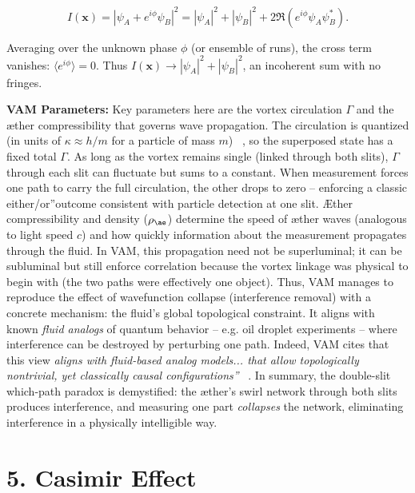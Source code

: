 \documentclass[a4paper, aps,preprint,superscriptaddress, 12pt]{revtex4}
\begin{document}
\begin{equation}
    I(\mathbf{x}) = |\psi_A + e^{i\phi}\psi_B|^2 = |\psi_A|^2 + |\psi_B|^2 + 2\Re(e^{i\phi}\psi_A \psi_B^*).
\end{equation}

Averaging over the unknown phase $\phi$ (or ensemble of runs), the cross term vanishes: $\langle e^{i\phi}\rangle = 0$. Thus $I(\mathbf{x}) \to |\psi_A|^2 + |\psi_B|^2$, an incoherent sum with no fringes.


\textbf{VAM Parameters:} Key parameters here are the vortex circulation $\Gamma$ and the æther compressibility that governs wave propagation. The circulation is quantized (in units of $\kappa \approx h/m$ for a particle of mass $m$)~\cite{Iskandarani2025c} , so the superposed state has a fixed total $\Gamma$. As long as the vortex remains single (linked through both slits), $\Gamma$ through each slit can fluctuate but sums to a constant. When measurement forces one path to carry the full circulation, the other drops to zero – enforcing a classic \grqq either/or\textquotedblright outcome consistent with particle detection at one slit. Æther compressibility and density ($\rho_{\ae}$) determine the speed of æther waves (analogous to light speed $c$) and how quickly information about the measurement propagates through the fluid. In VAM, this propagation need not be superluminal; it can be subluminal but still enforce correlation because the vortex linkage was physical to begin with (the two paths were effectively one object). Thus, VAM manages to reproduce the effect of wavefunction collapse (interference removal) with a concrete mechanism: the fluid's global topological constraint. It aligns with known \textit{fluid analogs} of quantum behavior – e.g. oil droplet experiments – where interference can be destroyed by perturbing one path. Indeed, VAM cites that this view \textit{\grqq aligns with fluid-based analog models... that allow topologically nontrivial, yet classically causal configurations\textquotedblright}~\cite{Iskandarani2025c} . In summary, the double-slit which-path paradox is demystified: the æther's swirl network through both slits produces interference, and measuring one part \textit{collapses} the network, eliminating interference in a physically intelligible way.


\section*{5. Casimir Effect}
\end{document}
